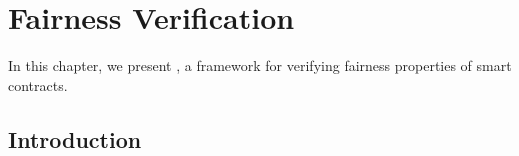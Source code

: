
\chapter{Fairness Verification} %
\label{ch:faircon} 

In this chapter, we present \faircon, a framework for verifying fairness properties of smart contracts.
\section{Introduction}\label{Sec_Introduction}
%
%
%

